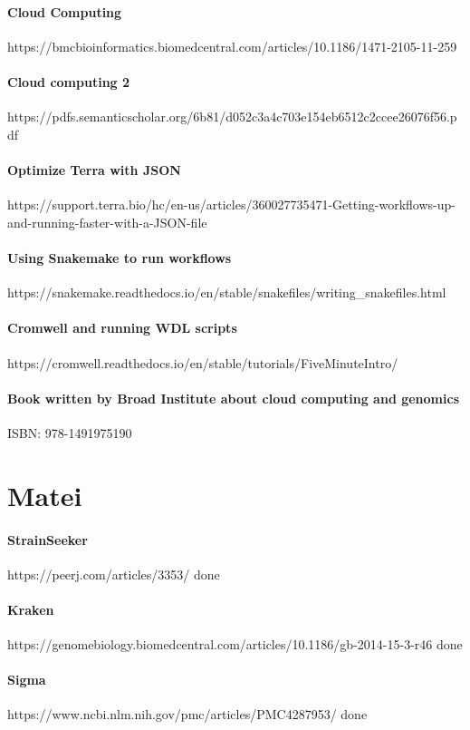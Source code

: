 \documentclass{article}
\begin{document}
\paragraph{Cloud Computing} https://bmcbioinformatics.biomedcentral.com/articles/10.1186/1471-2105-11-259
\paragraph{Cloud computing 2} https://pdfs.semanticscholar.org/6b81/d052c3a4c703e154eb6512c2ccee26076f56.pdf

\paragraph{Optimize Terra with JSON} https://support.terra.bio/hc/en-us/articles/360027735471-Getting-workflows-up-and-running-faster-with-a-JSON-file
\paragraph{Using Snakemake to run workflows} https://snakemake.readthedocs.io/en/stable/snakefiles/writing_snakefiles.html
\paragraph{Cromwell and running WDL scripts}https://cromwell.readthedocs.io/en/stable/tutorials/FiveMinuteIntro/
\paragraph{Book written by Broad Institute about cloud computing and genomics}  ISBN: 978-1491975190


\section*{Matei}
\paragraph{StrainSeeker}
https://peerj.com/articles/3353/ done


\paragraph{Kraken}
https://genomebiology.biomedcentral.com/articles/10.1186/gb-2014-15-3-r46
done

\paragraph{Sigma}
https://www.ncbi.nlm.nih.gov/pmc/articles/PMC4287953/
done
\end{document}
